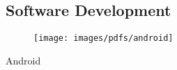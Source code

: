 \begin{aside}
    \subsection{Software Development}
      \begin{center}
        \begin{minipage}[t]{12mm}
          \begin{center}
            \begin{figure}
              \texttt{[image: images/pdfs/android]}
            \end{figure}
            \small{Android}
          \end{center}
        \end{minipage}\hspace{0.5mm}%
      \end{center}


\end{aside}
